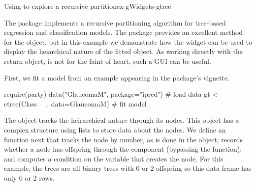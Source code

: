 \begin{example}{Using  to explore a recursive partition}{ex-gWidgets-gtree}

The  package implements a recursive partitioning algorithm
for tree-based regression and classification models. The package
provides an excellent  method for the object, but in this
example we demonstrate how the  widget can be used to
display the heiarchical nature of the fitted object. As working
directly with the return object, is not for the faint of heart, such a
GUI can be useful.

First, we fit a model from an
example appearing in the package's vignette.

\begin{Schunk}
\begin{Sinput}
 require(party)
 data("GlaucomaM", package="ipred")      # load data
 gt <- ctree(Class ~ ., data=GlaucomaM)  # fit model
\end{Sinput}
\end{Schunk}

The  object tracks the heirarchical nature through its
nodes. This object has a complex structure using lists to store data
about the nodes. We define an  function next that
tracks the node by number, as is done in the  object;
records whether a node has offspring through the 
component (bypassing the  function); and computes a
condition on the variable that creates the node. For this example, the
trees are all binary trees with 0 or 2 offspring so this data frame
has only 0 or 2 rows.

\begin{Schunk}
\end{Schunk}
\end{example}
